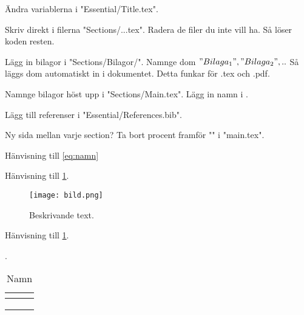 
Ändra variablerna i "Essential/Title.tex".

Skriv direkt i filerna "Sections/...tex".
Radera de filer du inte vill ha. Så löser koden resten.

Lägg in bilagor i "Sections/Bilagor/".
Namnge dom $ "Bilaga_1", "Bilaga_2",.. $ Så läggs dom automatiskt in i dokumentet.
Detta funkar för .tex och .pdf.

Namnge bilagor höst upp i "Sections/Main.tex".
Lägg in namn i \edef\bilaganamn{{"namn 1","namn 2",""}}. 

Lägg till referenser i "Essential/References.bib".

Ny sida mellan varje section? Ta bort procent framför "\newpage" i "main.tex".




Hänvisning till \cref{eq:namn}
\begin{equation} \label{eq:namn}
\end{equation}


Hänvisning till \cref{fig:namn}.
\begin{figure} [H]
    \centering 
    \texttt{[image: bild.png]}
    \caption{Beskrivande text.}
    \label{fig:namn}
\end{figure}


Hänvisning till \cref{tab:namn}.
\begin{table}[H]
\caption{Namn} \label{tab:namn}.
\centering 
    \begin{tabular}{|c|c|c|}
    \hline
    \textbf{} & \textbf{} & \textbf{} \\
     \hline
 &  &  \\
    \hline
 &  &  \\
    \hline
 &  &  \\
    \hline
    \end{tabular} 
\end{table}


